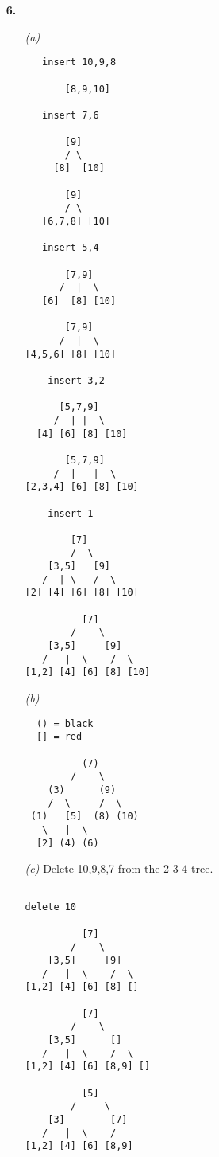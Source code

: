 \documentclass{article}
\begin{document}
\begin{enumerate}
\begin{enumerate}
\begin{enumerate}
  \end{enumerate}

\item[\textbf{6.}]

  \begin{enumerate}
  \item[\emph{(a)}]
  \begin{verbatim}
   insert 10,9,8

       [8,9,10]

   insert 7,6

       [9]
       / \
     [8]  [10]

       [9]
       / \
   [6,7,8] [10]

   insert 5,4

       [7,9]
      /  |  \
   [6]  [8] [10]

       [7,9]
      /  |  \
[4,5,6] [8] [10]

    insert 3,2

      [5,7,9]
     /  | |  \
  [4] [6] [8] [10]

       [5,7,9]
     /  |   |  \
[2,3,4] [6] [8] [10]

    insert 1

        [7]
        /  \
    [3,5]   [9]
   /  | \   /  \
[2] [4] [6] [8] [10]

          [7]
        /    \
    [3,5]     [9]
   /   |  \    /  \
[1,2] [4] [6] [8] [10]

  \end{verbatim}

  \item[\emph{(b)}]

  \begin{verbatim}
  () = black
  [] = red

          (7)
        /    \
    (3)      (9)
    /  \     /  \
 (1)   [5]  (8) (10)  
   \   |  \ 
  [2] (4) (6)

  \end{verbatim}

  \item[\emph{(c)}]
  Delete 10,9,8,7 from the 2-3-4 tree.

\begin{verbatim}

delete 10

          [7]
        /    \
    [3,5]     [9]
   /   |  \    /  \
[1,2] [4] [6] [8] []

          [7]
        /    \
    [3,5]      []
   /   |  \    /  \
[1,2] [4] [6] [8,9] []

          [5]
        /     \
    [3]        [7]
   /   |  \    /
[1,2] [4] [6] [8,9]


\end{verbatim}
\end{enumerate}
\end{enumerate}
\end{enumerate}
\end{document}
